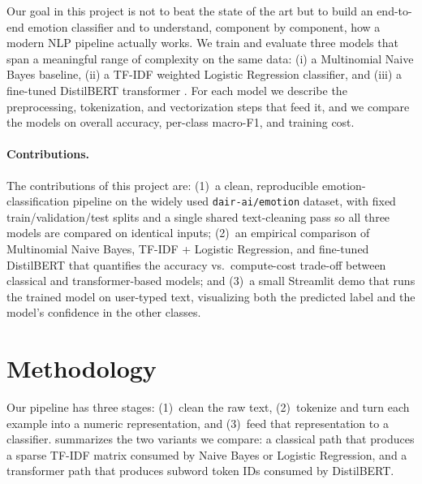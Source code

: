 \documentclass{article}
\theoremstyle{plain}
\begin{document}
Our goal in this project is not to beat the state of the art but to build
an end-to-end emotion classifier and to understand, component by
component, how a modern NLP pipeline actually works. We train and evaluate
three models that span a meaningful range of complexity on the same data:
(i) a Multinomial Naive Bayes baseline, (ii) a TF-IDF weighted Logistic
Regression classifier, and (iii) a fine-tuned DistilBERT transformer
\cite{sanh2019distilbert}. For each model we describe the preprocessing,
tokenization, and vectorization steps that feed it, and we compare the
models on overall accuracy, per-class macro-F1, and training cost.

\paragraph{Contributions.}
The contributions of this project are:
(1)~a clean, reproducible emotion-classification pipeline on the widely
used \texttt{dair-ai/emotion} dataset, with fixed train/validation/test
splits and a single shared text-cleaning pass so all three models are
compared on identical inputs;
(2)~an empirical comparison of Multinomial Naive Bayes, TF-IDF + Logistic
Regression, and fine-tuned DistilBERT that quantifies the accuracy vs.\
compute-cost trade-off between classical and transformer-based models; and
(3)~a small Streamlit demo that runs the trained model on user-typed text,
visualizing both the predicted label and the model's confidence in the
other classes.

\section{Methodology}
\label{sec:method}

Our pipeline has three stages: (1)~clean the raw text, (2)~tokenize and
turn each example into a numeric representation, and (3)~feed that
representation to a classifier.
 summarizes the two variants we compare: a classical
path that produces a sparse TF-IDF matrix consumed by Naive Bayes or
Logistic Regression, and a transformer path that produces subword token
IDs consumed by DistilBERT.
\end{document}
